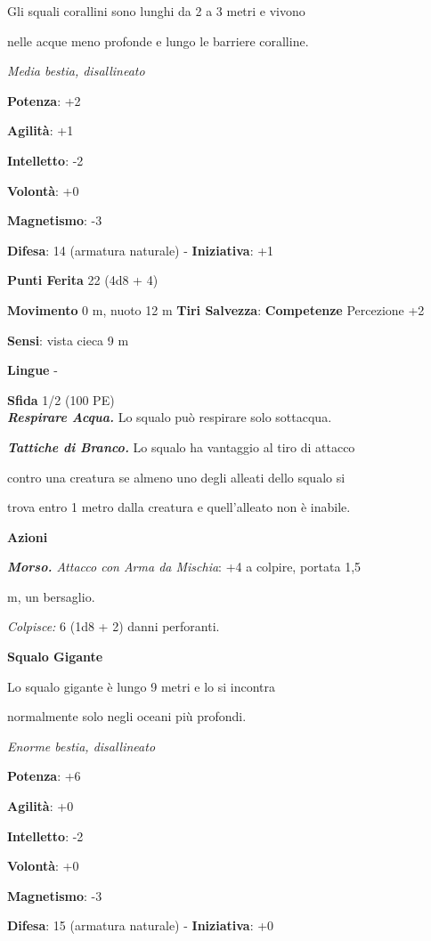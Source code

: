 \begin{multicols}{2}
Gli squali corallini sono lunghi da 2 a 3 metri e vivono

nelle acque meno profonde e lungo le barriere coralline.

\emph{Media bestia, disallineato}

\textbf{Potenza}: +2

\textbf{Agilità}: +1

\textbf{Intelletto}: -2

\textbf{Volontà}: +0

\textbf{Magnetismo}: -3

\textbf{Difesa}: 14 (armatura naturale) - \textbf{Iniziativa}: +1

\textbf{Punti Ferita} 22 (4d8 + 4)

\textbf{Movimento} 0 m, nuoto 12 m
\textbf{Tiri Salvezza}:
\textbf{Competenze} Percezione +2

\textbf{Sensi}: vista cieca 9 m

\textbf{Lingue} -

\textbf{Sfida} 1/2 (100 PE)\smallskip\\

\emph{\textbf{Respirare Acqua.}} Lo squalo può respirare solo sottacqua.

\emph{\textbf{Tattiche di Branco.}} Lo squalo ha vantaggio al tiro di
attacco

contro una creatura se almeno uno degli alleati dello squalo si

trova entro 1 metro dalla creatura e quell'alleato non è inabile.

\smallskip\textbf{Azioni}

\emph{\textbf{Morso.} Attacco con Arma da Mischia}: +4 a colpire,
portata 1,5

m, un bersaglio.

\emph{Colpisce:} 6 (1d8 + 2) danni perforanti.

\textbf{Squalo Gigante}

Lo squalo gigante è lungo 9 metri e lo si incontra

normalmente solo negli oceani più profondi.

\emph{Enorme bestia, disallineato}

\textbf{Potenza}: +6

\textbf{Agilità}: +0

\textbf{Intelletto}: -2

\textbf{Volontà}: +0

\textbf{Magnetismo}: -3

\textbf{Difesa}: 15 (armatura naturale) - \textbf{Iniziativa}: +0


\end{multicols}
